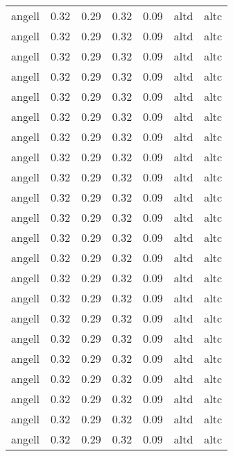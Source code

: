 \begin{tabular}{lrrrrll}
    angell &     0.32 &     0.29 &     0.32 &     0.09 &      altd &     altc \\
    angell &     0.32 &     0.29 &     0.32 &     0.09 &      altd &     altc \\
    angell &     0.32 &     0.29 &     0.32 &     0.09 &      altd &     altc \\
    angell &     0.32 &     0.29 &     0.32 &     0.09 &      altd &     altc \\
    angell &     0.32 &     0.29 &     0.32 &     0.09 &      altd &     altc \\
    angell &     0.32 &     0.29 &     0.32 &     0.09 &      altd &     altc \\
    angell &     0.32 &     0.29 &     0.32 &     0.09 &      altd &     altc \\
    angell &     0.32 &     0.29 &     0.32 &     0.09 &      altd &     altc \\
    angell &     0.32 &     0.29 &     0.32 &     0.09 &      altd &     altc \\
    angell &     0.32 &     0.29 &     0.32 &     0.09 &      altd &     altc \\
    angell &     0.32 &     0.29 &     0.32 &     0.09 &      altd &     altc \\
    angell &     0.32 &     0.29 &     0.32 &     0.09 &      altd &     altc \\
    angell &     0.32 &     0.29 &     0.32 &     0.09 &      altd &     altc \\
    angell &     0.32 &     0.29 &     0.32 &     0.09 &      altd &     altc \\
    angell &     0.32 &     0.29 &     0.32 &     0.09 &      altd &     altc \\
    angell &     0.32 &     0.29 &     0.32 &     0.09 &      altd &     altc \\
    angell &     0.32 &     0.29 &     0.32 &     0.09 &      altd &     altc \\
    angell &     0.32 &     0.29 &     0.32 &     0.09 &      altd &     altc \\
    angell &     0.32 &     0.29 &     0.32 &     0.09 &      altd &     altc \\
    angell &     0.32 &     0.29 &     0.32 &     0.09 &      altd &     altc \\
    angell &     0.32 &     0.29 &     0.32 &     0.09 &      altd &     altc \\
    angell &     0.32 &     0.29 &     0.32 &     0.09 &      altd &     altc \\

\end{tabular}
